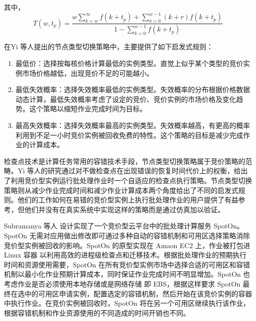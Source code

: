 其中，
\begin{equation}\label{eq_t}\nonumber 
T(w,t_p) = \frac{w\sum_{k=w}^{\infty}f(k+t_p)+\sum_{k=0}^{w-1}(k+r)f(k+t_p)}{1-\sum_{k=0}^{w-1}f(k+t_p)}
\end{equation}

在Yi 等人提出的节点类型切换策略中，主要提供了如下启发式规则：
\begin{enumerate}
\item 最低价：选择按每核价格计算最低的实例类型。直觉上似乎某个类型的竞价实例市场价格越低，出现竞价不足的可能越小。
\item 最低失效概率：选择失效概率最低的实例类型。失效概率的分布根据价格数据动态计算，最低失效概率考虑了设定的竞价、竞价实例的市场价格及变化趋势。这个策略以缩短作业完成时间为目标。
\item 最高失效概率：选择失效概率最高的实例类型。失效概率越高，有更高的概率利用到不足一小时竞价实例被回收免费的特性。这个策略的目标是减少完成作业的计算成本。
\end{enumerate}

检查点技术是计算任务常用的容错技术手段，节点类型切换策略属于竞价策略的范畴。Yi 等人的研究通过对不做检查点在出现错误的恢复时间代价上的权衡，给出了利用竞价型实例运行批处理作业时一个自适应的检查点执行策略。节点类型切换策略则从减少作业完成时间和减少作业计算成本两个角度给出了不同的启发式规则。他们的工作如何在易错的竞价型实例上执行批处理作业的用户提供了有益参考，但他们并没有在真实系统中实现这样的策略而是通过仿真加以验证。

Subramanya 等人 \cite{Subramanya:2015:SBC:2806777.2806851} 设计实现了一个竞价型云平台中的批处理计算服务 SpotOn。SpotOn 无需对应用做出修改即可通过多种自动的容错机制和可用区选择策略消除竞价型实例被回收的影响。SpotOn 的原型实现在 Amaon EC2 上，作业被打包进 Linux 容器 \cite{LXC} 以利用高效的进程级检查点和迁移技术。根据批处理作业的预期执行时间和资源使用需要，SpotOn 在所有竞价型实例市场中选择合适的可用区和容错机制以最小化作业预期计算成本，同时保证作业完成时间不明显增加。SpotOn 也考虑作业是否必须使用本地存储或是网络存储 即 EBS，根据这样要求 SpotOn 最终在选中的可用区申请实例，配置选定的容错机制，然后开始在该竞价实例的容器中执行作业。在竞价实例被回收时，SpotOn 将在另一个可用区继续执行该作业，根据容错机制和作业资源使用的不同造成的时间开销也不同。

